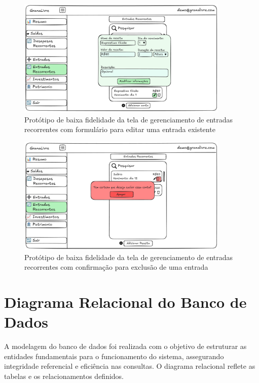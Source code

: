 \begin{figure}[H]
    \centering
    \includegraphics[width=0.9\textwidth]{imgs/07-entradas-recorrentes4.png}
    \caption{Protótipo de baixa fidelidade da tela de gerenciamento de entradas recorrentes com formulário para editar uma entrada existente}
    \label{fig:prot_entradas_recorrentes4}
\end{figure}

\begin{figure}[H]
    \centering
    \includegraphics[width=0.9\textwidth]{imgs/07-entradas-recorrentes5.png}
    \caption{Protótipo de baixa fidelidade da tela de gerenciamento de entradas recorrentes com confirmação para exclusão de uma entrada}
    \label{fig:prot_entradas_recorrentes5}
\end{figure}


\section{Diagrama Relacional do Banco de Dados}
A modelagem do banco de dados foi realizada com o objetivo de estruturar as entidades fundamentais para o funcionamento do sistema, assegurando integridade referencial e eficiência nas consultas. O diagrama relacional reflete as tabelas e os relacionamentos definidos.

